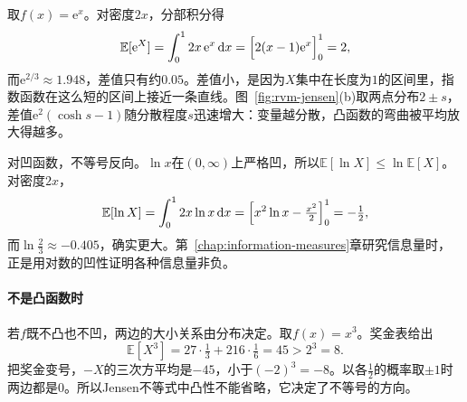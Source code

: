 取$f(x)=\mathrm{e}^{x}$。对密度$2x$，分部积分得
\[
 \mathbb{E}[\mathrm{e}^{X}]=\int_0^12x\,\mathrm{e}^{x}\,\mathrm{d}x=\Bigl[2(x-1)\mathrm{e}^{x}\Bigr]_0^1=2,
\]
而$\mathrm{e}^{2/3}\approx1.948$，差值只有约$0.05$。差值小，是因为$X$集中在长度为$1$的区间里，指数函数在这么短的区间上接近一条直线。图~\ref{fig:rvm-jensen}(b)取两点分布$2\pm s$，差值$\mathrm{e}^{2}(\cosh s-1)$随分散程度$s$迅速增大：变量越分散，凸函数的弯曲被平均放大得越多。

对凹函数，不等号反向。$\ln x$在$(0,\infty)$上严格凹，所以$\mathbb{E}[\ln X]\leq\ln\mathbb{E}[X]$。对密度$2x$，
\[
 \mathbb{E}[\ln X]=\int_0^12x\ln x\,\mathrm{d}x=\Bigl[x^{2}\ln x-\tfrac{x^{2}}{2}\Bigr]_0^1=-\tfrac12,
\]
而$\ln\tfrac23\approx-0.405$，确实更大。第~\ref{chap:information-measures}章研究信息量时，正是用对数的凹性证明各种信息量非负。

\paragraph{不是凸函数时}
若$f$既不凸也不凹，两边的大小关系由分布决定。取$f(x)=x^{3}$。奖金表给出
\[
 \mathbb{E}[X^{3}]=27\cdot\tfrac13+216\cdot\tfrac16=45>2^{3}=8 .
\]
把奖金变号，$-X$的三次方平均是$-45$，小于$(-2)^{3}=-8$。以各$\tfrac12$的概率取$\pm1$时两边都是$0$。所以Jensen不等式中凸性不能省略，它决定了不等号的方向。
